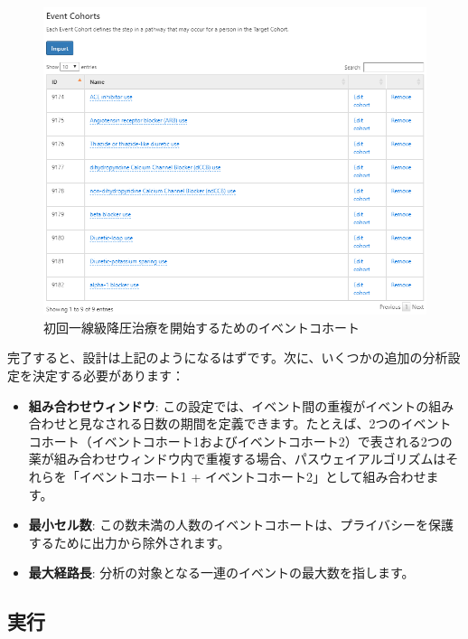 \documentclass[
  11pt]{book}
\providecommand{\tightlist}{%
  \setlength{\itemsep}{0pt}\setlength{\parskip}{0pt}}
\theoremstyle{definition}
\theoremstyle{definition}
\theoremstyle{definition}
\theoremstyle{definition}
\theoremstyle{remark}
\begin{document}
\begin{figure}

{\centering \includegraphics[width=1\linewidth]{images/Characterization/atlasPathwaysEventCohorts} 

}

\caption{初回一線級降圧治療を開始するためのイベントコホート}\label{fig:atlasPathwaysEventCohorts}
\end{figure}

完了すると、設計は上記のようになるはずです。次に、いくつかの追加の分析設定を決定する必要があります：

\begin{itemize}
\tightlist
\item
  \textbf{組み合わせウィンドウ}: この設定では、イベント間の重複がイベントの組み合わせと見なされる日数の期間を定義できます。たとえば、2つのイベントコホート（イベントコホート1およびイベントコホート2）で表される2つの薬が組み合わせウィンドウ内で重複する場合、パスウェイアルゴリズムはそれらを「イベントコホート1 + イベントコホート2」として組み合わせます。
\item
  \textbf{最小セル数}: この数未満の人数のイベントコホートは、プライバシーを保護するために出力から除外されます。
\item
  \textbf{最大経路長}: 分析の対象となる一連のイベントの最大数を指します。
\end{itemize}

\subsection{実行}\label{ux5b9fux884c-1}
\end{document}

